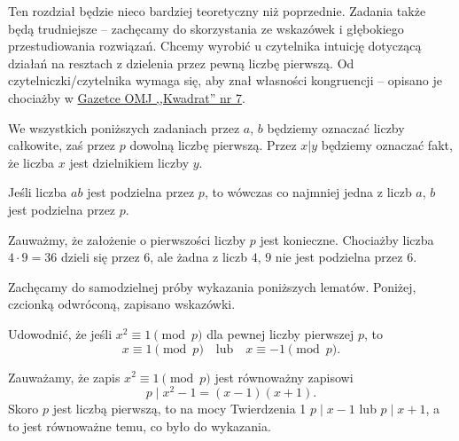 



\noindent
Ten rozdział będzie nieco bardziej teoretyczny niż poprzednie. Zadania także będą trudniejsze -- zachęcamy do skorzystania ze wskazówek i głębokiego przestudiowania rozwiązań. Chcemy wyrobić u czytelnika intuicję dotyczącą działań na resztach z dzielenia przez pewną liczbę pierwszą. Od czytelniczki/czytelnika wymaga się, aby znał własności kongruencji -- opisano je chociażby w  \href{https://omj.edu.pl/uploads/attachments/kwadrat-07-kolor.pdf}{Gazetce OMJ ,,Kwadrat'' nr 7}. 

\vspace{5px}

\noindent
We wszystkich poniższych zadaniach przez $a$, $b$ będziemy oznaczać liczby całkowite, zaś przez $p$ dowolną liczbę pierwszą. Przez $x \big| y$ będziemy oznaczać fakt, że liczba $x$ jest dzielnikiem liczby $y$.

\vspace{5px}

\noindent
Jeśli liczba $ab$ jest podzielna przez $p$, to wówczas co najmniej jedna z liczb $a$, $b$ jest podzielna przez $p$.

\vspace{15px}

\noindent
Zauważmy, że założenie o pierwszości liczby $p$ jest konieczne. Chociażby liczba $4 \cdot 9 = 36$ dzieli się przez $6$, ale żadna z liczb $4$, $9$ nie jest podzielna przez $6$.

\vspace{5px}
\noindent
Zachęcamy do samodzielnej próby wykazania poniższych lematów. Poniżej, czcionką odwróconą, zapisano wskazówki.

\vspace{5px}

\noindent
Udowodnić, że jeśli $x^2\equiv 1 \pmod{p}$ dla pewnej liczby pierwszej $p$, to \[   
    x\equiv 1 \pmod{p} \quad \text{lub} \quad x\equiv -1 \pmod{p}.
\]



\noindent
Zauważamy, że zapis $x^2\equiv 1 \pmod{p}$ jest równoważny zapisowi 
\[
    p \mid x^2-1=(x-1)(x+1).
\]
 Skoro $p$ jest liczbą pierwszą, to na mocy Twierdzenia 1 $p\mid x-1$ lub $p\mid x+1$, a to jest równoważne temu, co było do wykazania.
 
